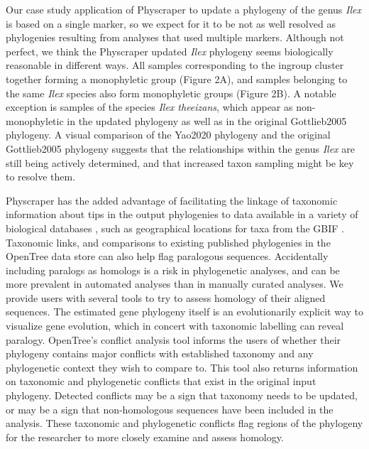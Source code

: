 \documentclass{bmcart}
\begin{document}
Our case study application of Physcraper to update a phylogeny of the genus \textit{Ilex} is based on a
single marker, so we expect for it to be not as well resolved as phylogenies resulting from analyses
that used multiple markers. Although not perfect,
we think the Physcraper updated \textit{Ilex} phylogeny seems biologically reasonable
in different ways. All samples
corresponding to the ingroup cluster together forming a monophyletic group (Figure 2A), and
samples belonging to the same \textit{Ilex} species also form
monophyletic groups (Figure 2B). A notable exception is samples of the species \textit{Ilex theeizans}, which appear as
non-monophyletic in the updated phylogeny as well as in the original Gottlieb2005 phylogeny.
A visual comparison of the Yao2020 phylogeny and the original Gottlieb2005 phylogeny suggests
that the relationships within the genus \textit{Ilex} are still being actively
determined, and that increased taxon sampling might be key to resolve them.

Physcraper has the added advantage of facilitating the linkage of taxonomic information about tips
in the output phylogenies to data available in a variety of biological databases
\cite{rees2017automated}, such as
geographical locations for taxa from the GBIF \cite{gbif_secretariat_gbif_2019}.
Taxonomic links, and comparisons to existing published phylogenies in the OpenTree
data store can also help flag paralogous sequences.
Accidentally including paralogs as homologs is a risk in phylogenetic analyses,
and can be more prevalent in automated analyses than in manually curated analyses.
We provide users with several tools to try to assess homology of their aligned sequences.
The estimated gene phylogeny itself is an evolutionarily explicit way to visualize gene
evolution, which in concert with taxonomic labelling can reveal paralogy.
OpenTree's conflict analysis tool informs the users of whether their phylogeny contains major
conflicts with established taxonomy and any phylogenetic context they wish to compare to.
This tool also returns information on taxonomic and phylogenetic conflicts that exist
in the original input phylogeny.
Detected conflicts may be a sign that taxonomy needs to be updated, or may be a sign
that non-homologous sequences have been included in the analysis.
These taxonomic and phylogenetic conflicts flag regions of the phylogeny for the researcher
to more closely examine and assess homology.
\end{document}
